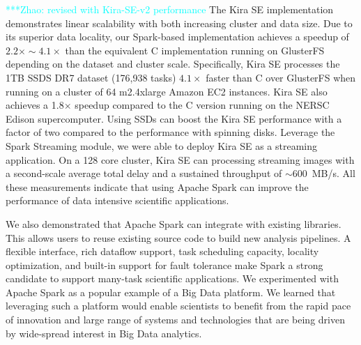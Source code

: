 \documentclass[10pt,journal,compsoc]{IEEEtran}
\newcommand{\zhaonote}[1]{{\textcolor{cyan}    { ***Zhao:      #1 }}}
\newcommand{\zhaonote}[1]{}
\begin{document}
\zhaonote{revised with Kira-SE-v2 performance}
The Kira SE implementation demonstrates linear scalability with both increasing cluster and data
size. Due to its superior data locality, our Spark-based implementation achieves a speedup of $2.2\times\sim4.1\times$ than the equivalent C 
implementation running on GlusterFS depending on the dataset and cluster scale. 
Specifically, Kira SE processes the 1TB SSDS DR7 dataset (176,938 tasks)
$4.1\times$ faster than C over GlusterFS when running on a cluster of 64 m2.4xlarge Amazon EC2 instances. 
Kira SE also achieves a 1.8$\times$ speedup compared to the C version running on the NERSC Edison supercomputer.  
Using SSDs can boost the Kira SE performance with a factor of two compared to the performance with spinning disks.
Leverage the Spark Streaming module, we were able to deploy Kira SE as a streaming application.
On a 128 core cluster, Kira SE can processing streaming images with a second-scale average total delay and
a sustained throughput of $\sim$600~MB/s.
All these measurements indicate that using Apache Spark can improve the performance of data intensive scientific applications.

We also demonstrated that Apache Spark can integrate with existing libraries.
This allows users to reuse existing source code to build new analysis pipelines.
A flexible interface, rich dataflow support, task scheduling capacity, locality optimization, and built-in support for fault tolerance make Spark a 
strong candidate to support many-task scientific applications. 
We experimented with Apache Spark as a popular example of a Big Data platform. We learned that
leveraging such a platform would enable scientists to benefit from the rapid pace of innovation 
and large range of systems and technologies that are being driven by wide-spread interest in Big Data analytics.




%
\end{document}
